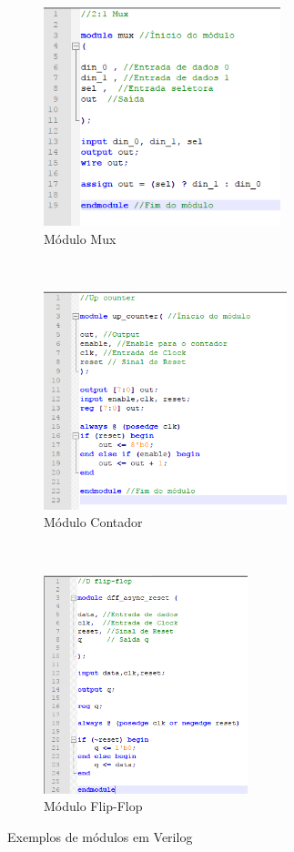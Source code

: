 \begin{figure}[ht!]
    \centering
    \begin{subfigure}[t]{0.5\textwidth}
        \centering
        \includegraphics[height=2.5in]{figuras/mux.PNG}
        \caption{Módulo Mux}
        \label{mux}
    \end{subfigure}%
    ~ 
    \begin{subfigure}[t]{0.5\textwidth}
        \centering
        \includegraphics[height=2.5in]{figuras/upcounter.PNG}
        \caption{Módulo Contador}
        \label{upcounter}
        \end{subfigure}%
        
        ~ 
    \begin{subfigure}[t]{0.5\textwidth}
        \centering
        \includegraphics[height=2.5in]{figuras/ff.PNG}
        \caption{Módulo Flip-Flop}
        \label{ff}
    \end{subfigure}
    \caption{Exemplos de módulos em Verilog}
\end{figure}

